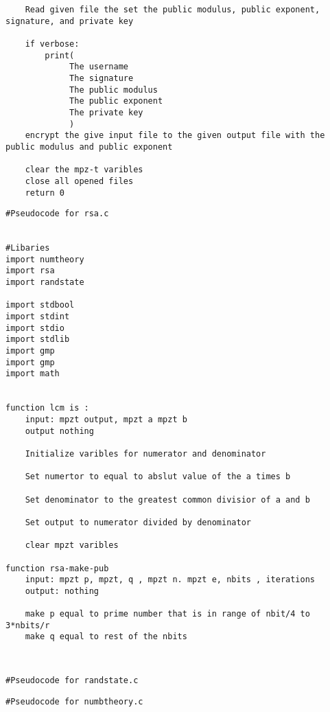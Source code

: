 \documentclass[11pt]{article} %
\begin{document}
\begin{flushleft}
\begin{lstlisting}
    Read given file the set the public modulus, public exponent, signature, and private key

    if verbose:
        print(
             The username
             The signature
             The public modulus
             The public exponent
             The private key   
             )
    encrypt the give input file to the given output file with the public modulus and public exponent
    
    clear the mpz-t varibles
    close all opened files
    return 0
\end{lstlisting}


\begin{lstlisting}
#Pseudocode for rsa.c


#Libaries
import numtheory
import rsa
import randstate

import stdbool
import stdint
import stdio
import stdlib
import gmp
import gmp
import math


function lcm is :
    input: mpzt output, mpzt a mpzt b
    output nothing

    Initialize varibles for numerator and denominator
    
    Set numertor to equal to abslut value of the a times b
    
    Set denominator to the greatest common divisior of a and b

    Set output to numerator divided by denominator
    
    clear mpzt varibles

function rsa-make-pub
    input: mpzt p, mpzt, q , mpzt n. mpzt e, nbits , iterations
    output: nothing
    
    make p equal to prime number that is in range of nbit/4 to 3*nbits/r
    make q equal to rest of the nbits

    

\end{lstlisting}

\begin{lstlisting}
#Pseudocode for randstate.c

\end{lstlisting}


\begin{lstlisting}
#Pseudocode for numbtheory.c

\end{lstlisting}

\end{flushleft}
\end{document}
